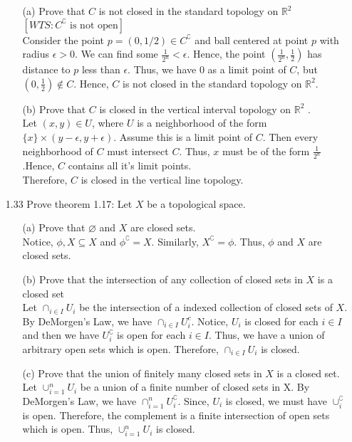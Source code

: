 \documentclass[12pt]{article}
\newcommand{\R}{\mathds{R}}
\begin{document}
\begin{enumerate}
		\begin{enumerate}
			\item[(a)] Prove that $C$ is not closed in the standard topology on $\mathbb { R } ^ { 2 }$\\
			 $ [WTS: C^\complement \text{ is not open}] $\\
			Consider the point $ p=(0,1/2)\in C^\complement$ and ball centered at point  $p$ with radius $ \epsilon>0 $. We can find some $ \frac{1}{2^n}<\epsilon$. Hence, the point $ (\frac{1}{2^n},\frac{1}{2}) $ has distance to $ p $ less than $ \epsilon $. Thus, we have $ 0 $ as a limit point of $ C $, but $ (0,\frac{1}{2}) \not\in C$. Hence, $ C $ is not closed in the standard topology on $ \R^2 $.
			\item[(b)] Prove that $C$ is closed in the vertical interval topology on $\mathbb { R } ^ { 2 }$ . \\
			Let $ (x,y)\in U$, where $ U $ is a neighborhood of the form $ \{x\}\times (y-\epsilon,y+\epsilon) $. Assume this is a limit point of $ C $. Then every neighborhood of $ C $ must intersect $ C $. Thus, $ x $ must be of the form $ \frac{1}{2^n} $.Hence, $ C $ contains all it's limit points.\\
			 Therefore, $ C $ is closed in the vertical line topology.
		\end{enumerate}
	\item[1.33] Prove theorem 1.17: Let $ X $ be a topological space.\\
		\begin{enumerate}
			\item[(a)]Prove that $\varnothing$ and $X$ are closed sets.\\
				Notice, $ \phi,X \subseteq X $ and $ \phi^\complement = X $. Similarly, $ X^\complement = \phi $. Thus, $ \phi $ and $ X $ are closed sets.
			\item[(b)]Prove that the intersection of any collection of closed sets in $X$ is a closed set\\
				Let $ \cap_{i\in I} U_i $ be the intersection of a indexed collection of closed sets of $ X $. By DeMorgen's Law, we have $\cap_{i\in I} U_i^c  $. Notice, $ U_i $ is closed for each $ i\in I $ and then we have $ U_i^\complement $ is open for each $ i\in I $. Thus, we have a union of arbitrary open sets which is open. Therefore, $ \cap_{i\in I} U_i $ is closed.
			\item[(c)]Prove that the union of finitely many closed sets in $X$ is a closed set.\\
				Let $ \cup_{i=1}^n U_i $ be a union of a finite number of closed sets in X. By DeMorgen's Law, we have $ \cap_{i=1}^n U_i^\complement $. Since, $ U_i $ is closed, we must have $\cup_i^\complement $ is open. Therefore, the complement is a finite intersection of open sets which is open. Thus, $ \cup_{i=1}^n U_i $ is closed.

\end{enumerate}
\end{enumerate}
\end{document}
